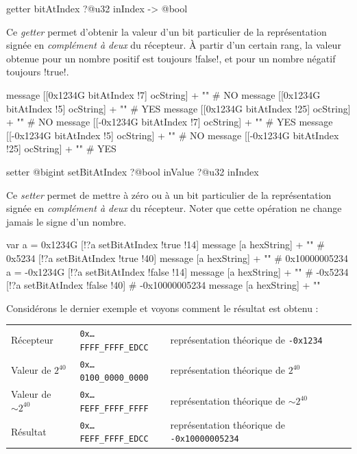\begin{galgas4box}
getter bitAtIndex ?@u32 inIndex -> @bool
\end{galgas4box}

Ce \emph{getter} permet d'obtenir la valeur d'un bit particulier de la représentation signée en \emph{complément à deux} du récepteur. À partir d'un certain rang, la valeur obtenue pour un nombre positif est toujours \ggsq!false!, et pour un nombre négatif toujours \ggsq!true!.

\begin{galgas4}
message [[0x1234G bitAtIndex !7] ocString] + "\n" # NO
message [[0x1234G bitAtIndex !5] ocString] + "\n" # YES
message [[0x1234G bitAtIndex !25] ocString] + "\n" # NO
message [[-0x1234G bitAtIndex !7] ocString] + "\n" # YES
message [[-0x1234G bitAtIndex !5] ocString] + "\n" # NO
message [[-0x1234G bitAtIndex !25] ocString] + "\n" # YES
\end{galgas4}


\begin{galgas4box}
setter @bigint setBitAtIndex ?@bool inValue ?@u32 inIndex
\end{galgas4box}

Ce \emph{setter} permet de mettre à zéro ou à un bit particulier de la représentation signée en \emph{complément à deux} du récepteur. Noter que cette opération ne change jamais le signe d'un nombre.

\begin{galgas4}
var a = 0x1234G
[!?a setBitAtIndex !true !14]
message [a hexString] + "\n" # 0x5234
[!?a setBitAtIndex !true !40]
message [a hexString] + "\n" # 0x10000005234
a = -0x1234G
[!?a setBitAtIndex !false !14]
message [a hexString] + "\n" # -0x5234
[!?a setBitAtIndex !false !40] # -0x10000005234
message [a hexString] + "\n"
\end{galgas4}

Considérons le dernier exemple et voyons comment le résultat est obtenu :

\begin{tabular}{llll}
Récepteur & \texttt{0x…FFFF\_FFFF\_EDCC} & représentation théorique de \texttt{-0x1234}\\
Valeur de $2^{40}$ & \texttt{0x…0100\_0000\_0000} & représentation théorique de $2^{40}$ \\
Valeur de $\sim2^{40}$ & \texttt{0x…FEFF\_FFFF\_FFFF} & représentation théorique de $\sim2^{40}$ \\
Résultat & \texttt{0x…FEFF\_FFFF\_EDCC} & représentation théorique de \texttt{-0x10000005234} \\
\end{tabular}

